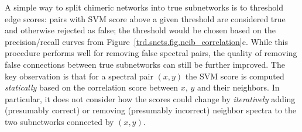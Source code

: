 \documentclass[arial,11pt]{article}
\begin{document}
A simple way to split chimeric networks into true subnetworks is to threshold edge scores: pairs with SVM score above a given threshold are considered true and otherwise rejected as false; the threshold would be chosen based on the precision/recall curves from Figure~\ref{trd.snets.fig.neib_correlation}c. While this procedure performs well for removing false spectral pairs, the quality of removing false connections between true subnetworks can still be further improved. The key observation is that for a spectral pair $(x,y)$ the SVM score is computed {\em statically} based on the correlation score between $x$, $y$ and their neighbors. In particular, it does not consider how the scores could change by {\em iteratively} adding (presumably correct) or removing (presumably incorrect) neighbor spectra to the two subnetworks connected by $(x,y)$.
%
\end{document}
